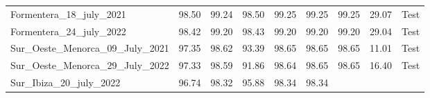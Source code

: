 \begin{table}[H]
{\begin{tabular}{lcccccccc}
            \\ \midrule
            Formentera\_18\_july\_2021             & 98.50
                                                   & 99.24
                                                   & 98.50
                                                   & 99.25
                                                   & 99.25
                                                   & 99.25
                                                   & 29.07
                                                   & {\color[HTML]{fc8d62}
                    Test}
            \\
            Formentera\_24\_july\_2022             & 98.42
                                                   & 99.20
                                                   & 98.43
                                                   & 99.20
                                                   & 99.20
                                                   & 99.20
                                                   & 29.04
                                                   & {\color[HTML]{fc8d62}
                    Test}
            \\
            Sur\_Oeste\_Menorca\_09\_July\_2021    & 97.35
                                                   & 98.62
                                                   & 93.39
                                                   & 98.65
                                                   & 98.65
                                                   & 98.65
                                                   & 11.01
                                                   & {\color[HTML]{fc8d62}
                    Test}
            \\
            Sur\_Oeste\_Menorca\_29\_July\_2022    & 97.33
                                                   & 98.59
                                                   & 91.86
                                                   & 98.64
                                                   & 98.65
                                                   & 98.65
                                                   & 16.40
                                                   & {\color[HTML]{fc8d62}
                    Test}
            \\
            Sur\_Ibiza\_20\_july\_2022             & 96.74
                                                   & 98.32
                                                   & 95.88
                                                   & 98.34
                                                   & 98.34

\end{tabular}}
\end{table}
